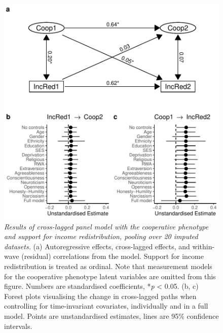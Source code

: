 \documentclass[
  man,floatsintext]{apa6}
\begin{document}
\begin{figure}
\centering
\includegraphics{manuscript_files/figure-latex/clpmPlotAIncRed-1.pdf}
\caption{\label{fig:clpmPlotAIncRed}\emph{Results of cross-lagged panel model with the
cooperative phenotype and support for income redistribution, pooling over 20
imputed datasets.} (a) Autoregressive effects, cross-lagged effects, and
within-wave (residual) correlations from the model. Support for income
redistribution is treated as ordinal. Note that measurement models for the
cooperative phenotype latent variables are omitted from this figure. Numbers are
standardised coefficients, *\emph{p} \textless{} 0.05. (b, c) Forest plots visualising the
change in cross-lagged paths when controlling for time-invariant covariates,
individually and in a full model. Points are unstandardised estimates, lines are
95\% confidence intervals.}
\end{figure}

\newpage
\end{document}
